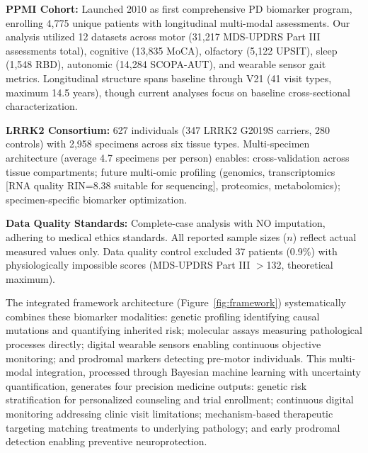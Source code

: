 \documentclass[11pt]{article}
\begin{document}
\textbf{PPMI Cohort:} Launched 2010 as first comprehensive PD biomarker program\cite{marek2018parkinson}, enrolling 4,775 unique patients with longitudinal multi-modal assessments. Our analysis utilized 12 datasets across motor (31,217 MDS-UPDRS Part III assessments total), cognitive (13,835 MoCA), olfactory (5,122 UPSIT), sleep (1,548 RBD), autonomic (14,284 SCOPA-AUT), and wearable sensor gait metrics. Longitudinal structure spans baseline through V21 (41 visit types, maximum 14.5 years), though current analyses focus on baseline cross-sectional characterization.

\textbf{LRRK2 Consortium:} 627 individuals (347 LRRK2 G2019S carriers, 280 controls) with 2,958 specimens across six tissue types. Multi-specimen architecture (average 4.7 specimens per person) enables: cross-validation across tissue compartments; future multi-omic profiling (genomics, transcriptomics [RNA quality RIN=8.38 suitable for sequencing], proteomics, metabolomics); specimen-specific biomarker optimization.

\textbf{Data Quality Standards:} Complete-case analysis with NO imputation, adhering to medical ethics standards. All reported sample sizes ($n$) reflect actual measured values only. Data quality control excluded 37 patients (0.9\%) with physiologically impossible scores (MDS-UPDRS Part III $>$132, theoretical maximum).

The integrated framework architecture (Figure~\ref{fig:framework}) systematically combines these biomarker modalities: genetic profiling identifying causal mutations and quantifying inherited risk; molecular assays measuring pathological processes directly; digital wearable sensors enabling continuous objective monitoring; and prodromal markers detecting pre-motor individuals. This multi-modal integration, processed through Bayesian machine learning with uncertainty quantification, generates four precision medicine outputs: genetic risk stratification for personalized counseling and trial enrollment; continuous digital monitoring addressing clinic visit limitations; mechanism-based therapeutic targeting matching treatments to underlying pathology; and early prodromal detection enabling preventive neuroprotection.
\end{document}

